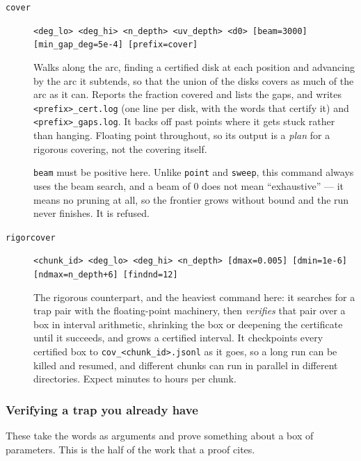 \documentclass{amsart}
\begin{document}
\begin{description}
\item[\texttt{cover}] \texttt{<deg\_lo> <deg\_hi> <n\_depth> <uv\_depth> <d0> [beam=3000] [min\_gap\_deg=5e-4] [prefix=cover]}


Walks along the arc, finding a certified disk at each position and advancing by the arc it
subtends, so that the union of the disks covers as much of the arc as it can.  Reports the
fraction covered and lists the gaps, and writes \verb|<prefix>_cert.log| (one line per disk, with
the words that certify it) and \verb|<prefix>_gaps.log|.  It backs off past points where it gets
stuck rather than hanging.  Floating point throughout, so its output is a \emph{plan} for a
rigorous covering, not the covering itself.

\texttt{beam} must be positive here.  Unlike \texttt{point} and \texttt{sweep}, this command
always uses the beam search, and a beam of $0$ does not mean ``exhaustive'' --- it means no
pruning at all, so the frontier grows without bound and the run never finishes.  It is refused.
\item[\texttt{rigorcover}] \texttt{<chunk\_id> <deg\_lo> <deg\_hi> <n\_depth> [dmax=0.005] [dmin=1e-6] [ndmax=n\_depth+6] [findnd=12]}


The rigorous counterpart, and the heaviest command here: it searches for a trap pair with the
floating-point machinery, then \emph{verifies} that pair over a box in interval arithmetic,
shrinking the box or deepening the certificate until it succeeds, and grows a certified interval.
It checkpoints every certified box to \verb|cov_<chunk_id>.jsonl| as it goes, so a long run can be
killed and resumed, and different chunks can run in parallel in different directories.  Expect
minutes to hours per chunk.
\end{description}

\subsubsection{Verifying a trap you already have}

These take the words as arguments and prove something about a box of parameters.  This is the
half of the work that a proof cites.
\end{document}
